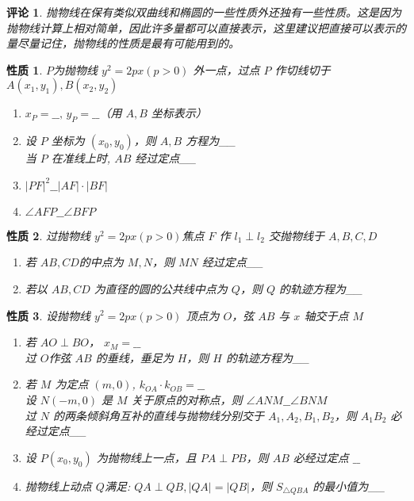 \documentclass[a4paper,10pt,twoside]{article}
\newtheorem{remark}{评论}
\newtheorem{proposition}{性质}
\begin{document}
\begin{remark}
    抛物线在保有类似双曲线和椭圆的一些性质外还独有一些性质。这是因为抛物线计算上相对简单，因此许多量都可以直接表示，这里建议把直接可以表示的量尽量记住，抛物线的性质是最有可能用到的。
\end{remark}
\begin{proposition}
     $ P  $为抛物线 $ y^2=2px(p>0) $ 外一点，过点 $ P  $ 作切线切于 $ A(x_1,y_1),B(x_2,y_2) $ 
     \begin{enumerate}[ $ (1) $ ]
        \item  $ x_P=\_\_ ,\,y_P=\_\_ $（用 $ A,B  $ 坐标表示）
        \item 设 $ P  $ 坐标为 $ (x_0,y_0)  $，则 $ A,B  $ 方程为\_\_ \\当 $ P  $ 在准线上时, $ AB  $ 经过定点\_\_
        \item  $ |PF|^2\_\_|AF|\cdot|BF| $ 
        \item  $ \angle AFP\_\_\angle BFP $  
     \end{enumerate}
\end{proposition}
\begin{proposition}
    过抛物线 $ y^2=2px(p>0) $焦点 $ F  $ 作 $ l_1\perp l_2 $ 交抛物线于 $ A,B,C,D  $
    \begin{enumerate}
        \item 若 $ AB,CD  $的中点为 $ M,N  $，则 $ MN  $ 经过定点\_\_ 
        \item   若以 $ AB,CD $ 为直径的圆的公共线中点为 $ Q  $，则
         $ Q  $ 的轨迹方程为\_\_  
    \end{enumerate} 
\end{proposition}
\begin{proposition}
    设抛物线 $ y^2=2px(p>0) $ 顶点为 $ O  $，弦 $ AB  $ 与 $ x  $ 轴交于点 $ M $
    \begin{enumerate}
        \item 若 $ AO\perp BO  $， $ x_M=\_\_ $\\过 $ O  $作弦 $ AB   $ 的垂线，垂足为 $ H  $，则 $ H  $ 的轨迹方程为\_\_ 
        \item 若 $ M  $ 为定点 $ (m,0)  $, $ k_{OA}\cdot k_{OB}=\_\_  $ \\设 $ N(-m,0)  $ 是 $ M  $ 关于原点的对称点，则 $ \angle ANM\_\_\angle BNM $\\过 $ N  $ 的两条倾斜角互补的直线与抛物线分别交于 $ A_1,A_2,B_1,B_2 $，则 $ A_1B_2  $ 必经过定点\_\_ 
        \item 设 $ P(x_0,y_0 ) $ 为抛物线上一点，且  $ PA\perp PB  $，则 $ AB  $ 必经过定点 $ \_\_  $ 
        \item 抛物线上动点 $ Q  $满足: $ QA\perp QB,
        |QA|=|QB| $，则 $ S_{\triangle QBA } $ 的最小值为\_\_    
    \end{enumerate} 

\end{proposition}
\end{document}
